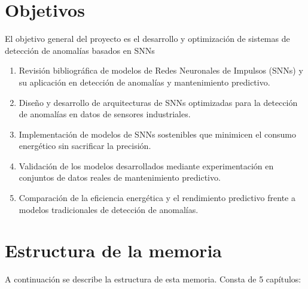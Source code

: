 \section{Objetivos}

El objetivo general del proyecto es el desarrollo y optimización de sistemas de detección de anomalías basados en SNNs

\begin{enumerate}
    \item Revisión bibliográfica de modelos de Redes Neuronales de Impulsos (SNNs) y su aplicación en detección de anomalías y mantenimiento predictivo.
    \item Diseño y desarrollo de arquitecturas de SNNs optimizadas para la detección de anomalías en datos de sensores industriales.
    \item Implementación de modelos de SNNs sostenibles que minimicen el consumo energético sin sacrificar la precisión.
    \item Validación de los modelos desarrollados mediante experimentación en conjuntos de datos reales de mantenimiento predictivo.
    \item Comparación de la eficiencia energética y el rendimiento predictivo frente a modelos tradicionales de detección de anomalías.
\end{enumerate}


\section{Estructura de la memoria}


A continuación se describe la estructura de esta memoria. Consta de 5 capítulos:

